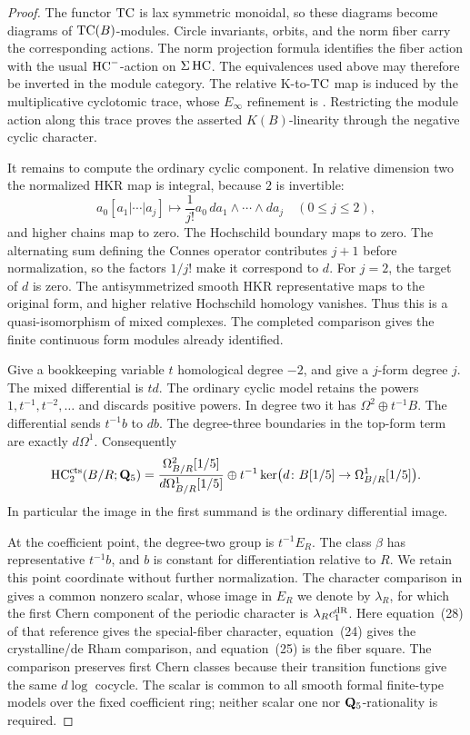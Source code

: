 \begin{proof}
The functor \(\operatorname{TC}\) is lax symmetric monoidal, so these diagrams
become diagrams of \(\operatorname{TC}(B)\)-modules.
Circle invariants, orbits, and the norm fiber carry the corresponding
actions. The norm projection formula identifies the fiber action
with the usual \(\operatorname{HC}^-\)-action on \(\Sigma\operatorname{HC}\).
The equivalences used above may therefore be inverted in the module
category.
The relative K-to-\(\operatorname{TC}\) map is induced by the multiplicative
cyclotomic trace, whose \(E_\infty\) refinement is
\cite[Theorem~7.4]{BGTTrace}.
Restricting the module action along this trace proves the asserted
\(K(B)\)-linearity through the negative cyclic character.

It remains to compute the ordinary cyclic component.
In relative dimension two the normalized HKR map is integral,
because \(2\) is invertible:
\[
 a_0[a_1|\cdots|a_j]\longmapsto
 \frac1{j!}a_0\,da_1\wedge\cdots\wedge da_j
 \quad (0\le j\le2),
\]
and higher chains map to zero.
The Hochschild boundary maps to zero.
The alternating sum defining the Connes operator contributes
\(j+1\) before normalization, so the factors \(1/j!\) make it
correspond to \(d\).
For \(j=2\), the target of \(d\) is zero.
The antisymmetrized smooth HKR representative maps to the original
form, and higher relative Hochschild homology vanishes.
Thus this is a quasi-isomorphism of mixed complexes.
The completed comparison gives the finite continuous form modules
already identified.

Give a bookkeeping variable \(t\) homological degree \(-2\), and give
a \(j\)-form degree \(j\).
The mixed differential is \(td\).
The ordinary cyclic model retains the powers
\(1,t^{-1},t^{-2},\ldots\) and discards positive powers.
In degree two it has \(\Omega^2\oplus t^{-1}B\).
The differential sends \(t^{-1}b\) to \(db\).
The degree-three boundaries in the top-form term are exactly
\(d\Omega^1\).
Consequently
\begin{equation}\label{d2:eq:hc-two}
 \operatorname{HC}_2^{\mathrm{cts}}(B/R;\mathbf{Q}_5)=
 \frac{\Omega^2_{B/R}[1/5]}{d\Omega^1_{B/R}[1/5]}
 \oplus
 t^{-1}\ker\bigl(d\colon B[1/5]\to\Omega^1_{B/R}[1/5]\bigr).
\end{equation}
In particular the image in the first summand is the ordinary
differential image.

At the coefficient point, the degree-two group is \(t^{-1}E_R\).
The class \(\beta\) has representative \(t^{-1}b\), and \(b\) is
constant for differentiation relative to \(R\).
We retain this point coordinate without further normalization.
The character comparison in
\cite[v2, Constructions~4.7--4.8 and~4.11,
Propositions~4.10 and~4.12, pp.~21--23]{AMMN}
gives a common nonzero scalar, whose image in \(E_R\) we denote
by \(\lambda_R\), for which the first Chern component of the
periodic character is \(\lambda_R c_1^{\mathrm{dR}}\).
Here equation~(28) of that reference gives the special-fiber
character, equation~(24) gives the crystalline/de Rham comparison,
and equation~(25) is the fiber square.
The comparison preserves first Chern classes because their
transition functions give the same \(d\log\) cocycle.
The scalar is common to all smooth formal finite-type models
over the fixed coefficient ring; neither scalar one nor
\(\mathbf{Q}_5\)-rationality is required.


\end{proof}
